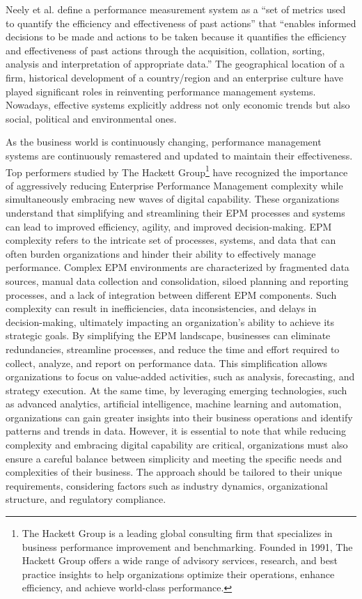 \documentclass[12pt,a4paper,openright,twoside]{book}
\begin{document}
Neely et al.\cite{neely2002performance} define a performance measurement system as a ``set of metrics used to quantify the efficiency and effectiveness of past actions'' that ``enables informed decisions to be made and actions to be taken because it quantifies the efficiency and effectiveness of past actions through the acquisition, collation, sorting, analysis and interpretation of appropriate data.''
%
The geographical location of a firm, historical development of a country/region and an enterprise culture have played significant roles in reinventing performance management systems. 
%
Nowadays, effective systems explicitly address not only economic trends but also social, political and environmental ones.

As the business world is continuously changing, performance management systems are continuously remastered and updated to maintain their effectiveness.
%
Top performers studied by The Hackett Group\footnote{The Hackett Group is a leading global consulting firm that specializes in business performance improvement and benchmarking. Founded in 1991, The Hackett Group offers a wide range of advisory services, research, and best practice insights to help organizations optimize their operations, enhance efficiency, and achieve world-class performance.} have recognized the importance of aggressively reducing Enterprise Performance Management complexity while simultaneously embracing new waves of digital capability.
%
These organizations understand that simplifying and streamlining their EPM processes and systems can lead to improved efficiency, agility, and improved decision-making.\cite{balog2017best}
%
EPM complexity refers to the intricate set of processes, systems, and data that can often burden organizations and hinder their ability to effectively manage performance. 
%
Complex EPM environments are characterized by fragmented data sources, manual data collection and consolidation, siloed planning and reporting processes, and a lack of integration between different EPM components. 
%
Such complexity can result in inefficiencies, data inconsistencies, and delays in decision-making, ultimately impacting an organization's ability to achieve its strategic goals.
%
By simplifying the EPM landscape, businesses can eliminate redundancies, streamline processes, and reduce the time and effort required to collect, analyze, and report on performance data. 
%
This simplification allows organizations to focus on value-added activities, such as analysis, forecasting, and strategy execution.
%
At the same time, by leveraging emerging technologies, such as advanced analytics, artificial intelligence, machine learning and automation, organizations can gain greater insights into their business operations and identify patterns and trends in data.
%
However, it is essential to note that while reducing complexity and embracing digital capability are critical, organizations must also ensure a careful balance between simplicity and meeting the specific needs and complexities of their business. The approach should be tailored to their unique requirements, considering factors such as industry dynamics, organizational structure, and regulatory compliance.
\end{document}
